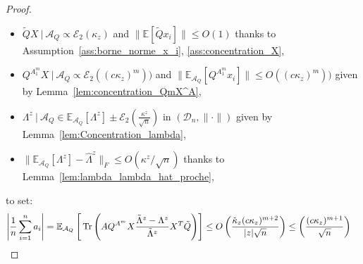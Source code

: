 \documentclass[a4papaer, titlepage]{book}
\begin{document}
\begin{proof}
\begin{itemize}
      \item $\tilde QX \ | \ \mathcal A_Q \propto \mathcal E_2(\kappa_z)$ and $\|\mathbb E[\tilde Qx_i]\|\leq O(1)$ thanks to Assumption~\ref{ass:borne_norme_x_i}, \ref{ass:concentration_X},
      \item $Q^{A_1^m}X \ | \ \mathcal A_Q \propto \mathcal E_2((c\kappa_z)^m)) $ and $\|\mathbb E_{\mathcal A_Q}[Q^{A_1^m}x_i] \| \leq O((c\kappa_z)^m))$ given by Lemma~\ref{lem:concentration_QmX^A},
      \item $ \Lambda^z \ | \ \mathcal A_Q\in \mathbb E_{\mathcal A_Q}[\Lambda^z] \pm \mathcal E_2 \left(\frac{\kappa^z}{\sqrt n}\right)$ in $(\mathcal{D}_{n}, \| \cdot \|)$ given by Lemma~\ref{lem:Concentration_lambda},
      \item $\|  \mathbb E_{\mathcal A_Q}[\Lambda^z] - \hat \Lambda^z\|_F \leq O(\kappa^z/\sqrt n)$ thanks to Lemma~\ref{lem:lambda_lambda_hat_proche},
    \end{itemize}
  to set:
  \begin{align*}
    \left\vert  \frac{1}{n} \sum_{i=1}^n a_i\right\vert
    &= \mathbb{E}_{\mathcal A_Q} \left[ \, \tr \left( A Q^{A^{m}}X\frac{\tilde \Lambda^z - \Lambda^z}{ \tilde \Lambda^z}X^T\tilde Q \right) \right] 
    \leq O \left( \frac{\check \kappa_z (c\kappa_z)^{m +2}}{|z|\sqrt n} \right) \leq \left( \frac{(c\kappa_z)^{m+1}}{\sqrt n} \right)

\end{align*}
\end{proof}
\end{document}
